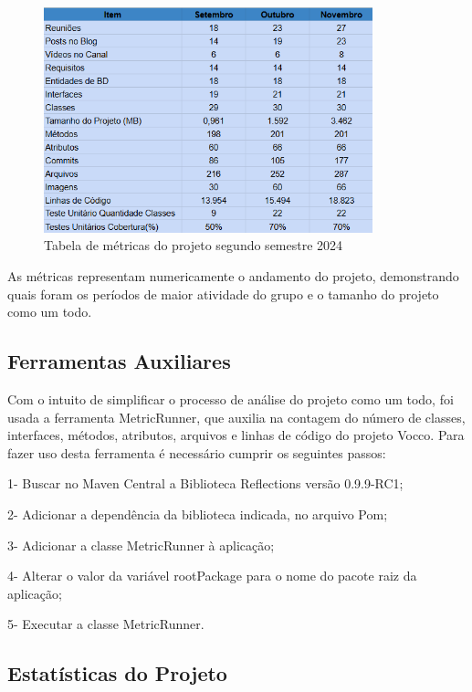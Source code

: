 \begin{figure}[ht]
        \centering
\includegraphics[width=0.85\textwidth]{images/tabela-metricas.png}
        \caption{Tabela de métricas do projeto segundo semestre 2024}
        \label{fig:enter-label}
    \end{figure}
As métricas representam numericamente o andamento do projeto, demonstrando quais foram os períodos de maior atividade do grupo e o tamanho do projeto como um todo.

\newpage

\subsection{Ferramentas Auxiliares}

Com o intuito de simplificar o processo de análise do projeto como um todo, foi usada a ferramenta MetricRunner, que auxilia na contagem do número de classes, interfaces, métodos, atributos, arquivos e linhas de código do projeto Vocco.
Para fazer uso desta ferramenta é necessário cumprir os seguintes passos: 

1- Buscar no Maven Central a Biblioteca Reflections versão 0.9.9-RC1;

2- Adicionar a dependência da biblioteca indicada, no arquivo Pom;

3- Adicionar a classe MetricRunner à aplicação;

4- Alterar o valor da variável rootPackage para o nome do pacote raiz da aplicação;  

5- Executar a classe MetricRunner.


\subsection{Estatísticas do Projeto}

